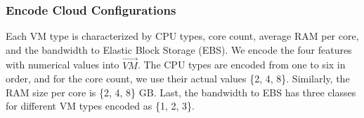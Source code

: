 \subsubsection*{Encode Cloud Configurations}
Each VM type is characterized by CPU types, core count, average RAM per core, and the bandwidth to Elastic Block Storage (EBS). We encode the four features with numerical values into $\vec{\mathit{VM}}$. The CPU types are encoded from one to six in order, and for the core count, we use their actual values \{2, 4, 8\}.
Similarly, the RAM size per core is \{2, 4, 8\} GB. Last, the bandwidth to EBS has three classes for different VM types encoded as \{1, 2, 3\}.

% 

